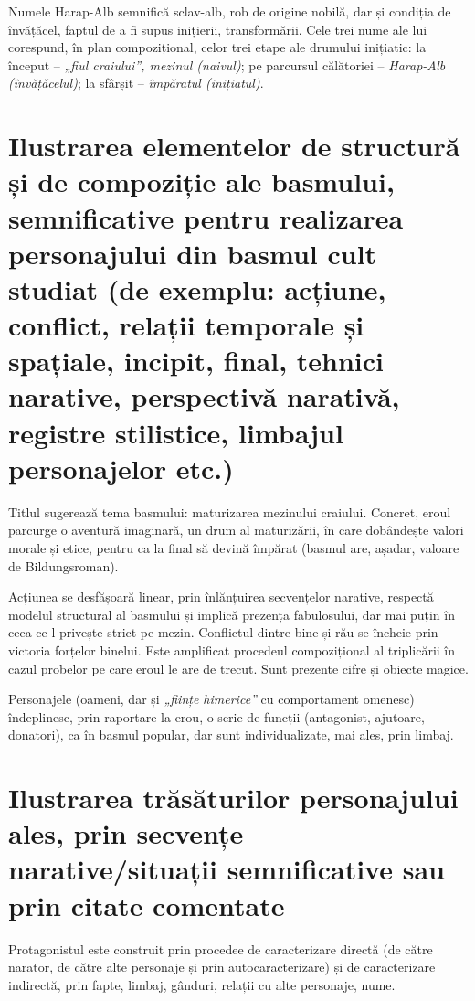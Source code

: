 Numele Harap-Alb semnifică sclav-alb, rob de origine nobilă, dar și condiția de învățăcel, faptul de a fi supus inițierii, transformării. Cele trei nume ale lui corespund, în plan compozițional, celor trei etape ale drumului inițiatic: la început -- \textit{„fiul craiului”, mezinul (naivul)}; pe parcursul călătoriei -- \textit{Harap-Alb (învățăcelul)}; la sfârșit -- \textit{împăratul (inițiatul)}.


\section{Ilustrarea elementelor de structură și de compoziție ale basmului, semnificative pentru realizarea personajului din basmul cult studiat {\footnotesize\normalfont (de exemplu: acțiune, conflict, relații temporale și spațiale, incipit, final, tehnici narative, perspectivă narativă, registre stilistice, limbajul personajelor etc.)}}

Titlul sugerează tema basmului: maturizarea mezinului craiului. Concret, eroul parcurge o aventură imaginară, un drum al maturizării, în care dobândește valori morale și etice, pentru ca la final să devină împărat (basmul are, așadar, valoare de Bildungsroman).

Acțiunea se desfășoară linear, prin înlănțuirea secvențelor narative, respectă modelul structural al basmului și implică prezența fabulosului, dar mai puțin în ceea ce-l privește strict pe mezin. Conflictul dintre bine și rău se încheie prin victoria forțelor binelui. Este amplificat procedeul compozițional al triplicării în cazul probelor pe care eroul le are de trecut. Sunt prezente cifre și obiecte magice.

Personajele (oameni, dar și \textit{„ființe himerice”} cu comportament omenesc) îndeplinesc, prin raportare la erou, o serie de funcții (antagonist, ajutoare, donatori), ca în basmul popular, dar sunt individualizate, mai ales, prin limbaj.


\section{Ilustrarea trăsăturilor personajului ales, prin secvențe \\ narative/situații semnificative sau prin citate comentate}

Protagonistul este construit prin procedee de caracterizare directă (de către narator, de către alte personaje și prin autocaracterizare) și de caracterizare indirectă, prin fapte, limbaj, gânduri, relații cu alte personaje, nume.

